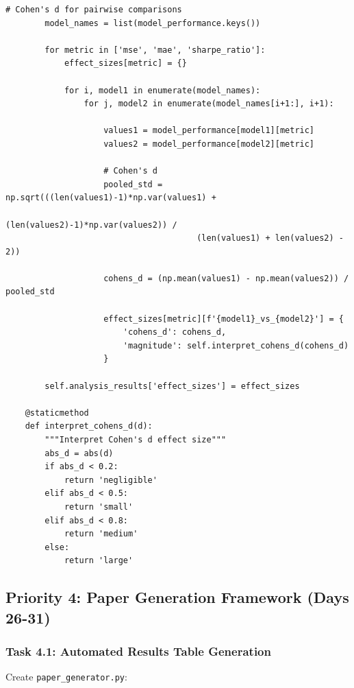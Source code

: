 \documentclass[11pt]{article}
\begin{document}
\begin{lstlisting}[style=pythonstyle, caption=Statistical Analysis Framework]
        # Cohen's d for pairwise comparisons
        model_names = list(model_performance.keys())
        
        for metric in ['mse', 'mae', 'sharpe_ratio']:
            effect_sizes[metric] = {}
            
            for i, model1 in enumerate(model_names):
                for j, model2 in enumerate(model_names[i+1:], i+1):
                    
                    values1 = model_performance[model1][metric]
                    values2 = model_performance[model2][metric]
                    
                    # Cohen's d
                    pooled_std = np.sqrt(((len(values1)-1)*np.var(values1) + 
                                        (len(values2)-1)*np.var(values2)) / 
                                       (len(values1) + len(values2) - 2))
                    
                    cohens_d = (np.mean(values1) - np.mean(values2)) / pooled_std
                    
                    effect_sizes[metric][f'{model1}_vs_{model2}'] = {
                        'cohens_d': cohens_d,
                        'magnitude': self.interpret_cohens_d(cohens_d)
                    }
                    
        self.analysis_results['effect_sizes'] = effect_sizes
        
    @staticmethod
    def interpret_cohens_d(d):
        """Interpret Cohen's d effect size"""
        abs_d = abs(d)
        if abs_d < 0.2:
            return 'negligible'
        elif abs_d < 0.5:
            return 'small'
        elif abs_d < 0.8:
            return 'medium'
        else:
            return 'large'
\end{lstlisting}

\subsection{Priority 4: Paper Generation Framework (Days 26-31)}

\subsubsection{Task 4.1: Automated Results Table Generation}

Create \texttt{paper\_generator.py}:
\end{document}
